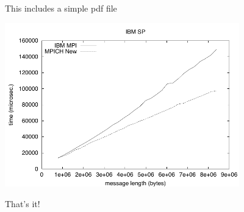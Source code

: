 \documentclass{article}
\begin{document}
This includes a simple pdf file
\centerline{\includegraphics[width=4in]{testf1}}
That's it!
\end{document}
